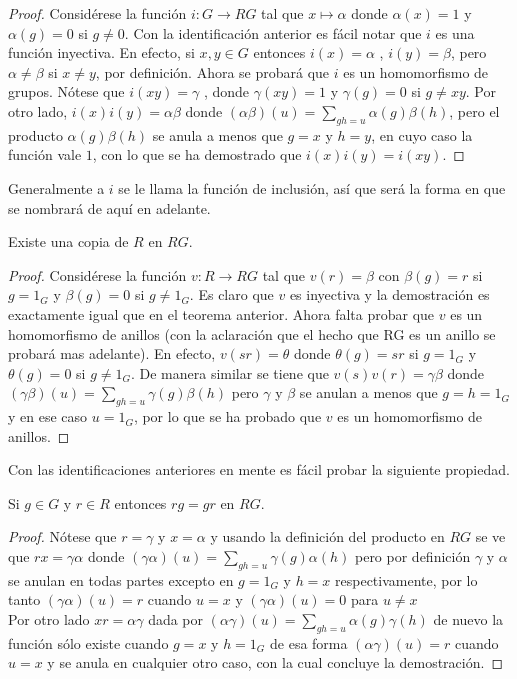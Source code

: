\begin{proof}
Considérese la función $i \colon G \to RG$ tal que $x \mapsto \alpha$ donde $\alpha(x)=1$ y $\alpha(g)=0$ si $g\neq 0$. Con la identificación anterior es fácil notar que $i$ es una función inyectiva.
En efecto, si $x,y \in G$ entonces $i(x)=\alpha$ , $i(y)=\beta$, pero $\alpha \neq \beta$ si $x \neq y$, por definición.
Ahora se probará que $i$ es un homomorfismo de grupos. Nótese que $i(xy)=\gamma$ , donde $\gamma(xy)=1$ y $\gamma(g)=0$ si $g \neq xy$. Por otro lado, $i(x)i(y)=\alpha\beta$ donde $(\alpha\beta)(u)= \sum_{gh=u}\alpha(g)\beta(h)  $, pero el producto $ \alpha(g)\beta(h)  $ se anula a menos que  $g=x$ y $h=y$, en cuyo caso la función vale $1$, con lo que se ha demostrado que  $i(x)i(y)=i(xy)$. 
\end{proof}

Generalmente a $i$ se le llama la función de inclusión, así que será la forma en que se nombrará de aquí en adelante.

\begin{teorema}
Existe una copia de $R$ en $RG$.
\end{teorema}


\begin{proof}
Considérese la función $v \colon R \to RG$ tal que $v(r) = \beta$ con $\beta(g) = r$ si $ g = 1_G $ y $\beta(g)=0$ si $g \neq 1_G$. Es claro que $v$ es inyectiva y la demostración es exactamente igual que en el teorema anterior. Ahora falta probar que $v$ es un homomorfismo de anillos (con la aclaración que el hecho que RG es un anillo se probará mas adelante). En efecto, $v(sr)=\theta$ donde $\theta(g)=sr$ si $g=1_G$ y $\theta(g) = 0$ si $g \neq 1_G$. De manera similar se tiene que $v(s)v(r)=\gamma\beta$ donde $(\gamma\beta)(u)=\sum_{gh=u}\gamma(g)\beta(h) $ pero $\gamma $ y $\beta$ se anulan a menos que $g=h=1_G$ y en ese caso $u=1_G$, por lo que se ha probado que $v$ es un homomorfismo de anillos. \qedhere
\end{proof}

Con las identificaciones anteriores en mente es fácil probar la siguiente propiedad. 
\begin{propiedad}
Si $g \in G$ y $r \in R$ entonces $rg=gr$ en $RG$.
\end{propiedad}
 
\begin{proof}
Nótese que $r=\gamma$ y $x=\alpha$ y usando la definición del producto en $RG$ se ve que $rx=\gamma\alpha$ donde $(\gamma\alpha)(u)=\sum_{gh=u}\gamma(g) \alpha(h) $ pero por definición $\gamma$ y $\alpha$ se anulan en todas partes excepto en $g=1_G$ y $h=x$ respectivamente, por lo tanto $(\gamma\alpha)(u)=r$ cuando $u=x$ y $(\gamma\alpha)(u)=0$ para $u \neq x $ \\
Por otro lado $xr=\alpha\gamma$ dada por $(\alpha\gamma)(u)=\sum_{gh=u}\alpha(g)\gamma(h)$ de nuevo la función sólo existe cuando $g=x$ y $h=1_G$ de esa forma $(\alpha\gamma)(u)=r$ cuando $u=x$ y se anula en cualquier otro caso, con la cual concluye la demostración.  \qedhere
 \end{proof}

